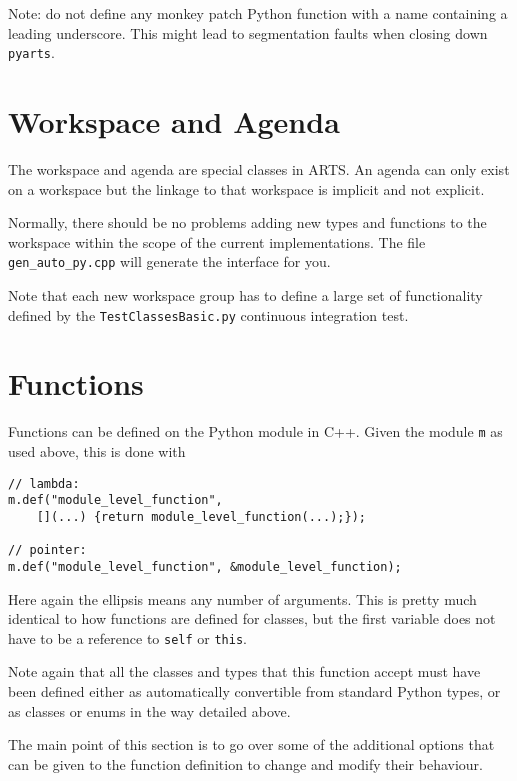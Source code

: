 Note: do not define any monkey patch Python function with a name containing a leading underscore.  This might lead to
segmentation faults when closing down \texttt{pyarts}.

\section{Workspace and Agenda}
The workspace and agenda are special classes in ARTS.  An agenda can only exist on a workspace but the linkage to that workspace 
is implicit and not explicit.

Normally, there should be no problems adding new types and functions to the workspace within the scope of the current implementations.  The file \verb|gen_auto_py.cpp| will generate the interface for you.

Note that each new workspace group has to define a large set of functionality defined by the \verb|TestClassesBasic.py| continuous integration test.

\section{Functions}
Functions can be defined on the Python module in C++.
Given the module \texttt{m} as used above, this is done with
\begin{verbatim}
// lambda:
m.def("module_level_function",
    [](...) {return module_level_function(...);});

// pointer:
m.def("module_level_function", &module_level_function);
\end{verbatim}
Here again the ellipsis means any number of arguments.
This is pretty much identical to how functions are defined for classes, but the first variable does not have to be a reference to \texttt{self} or \texttt{this}.

Note again that all the classes and types that this function accept must have been defined either as automatically convertible from standard Python types, or as classes or enums in the way detailed above.

The main point of this section is to go over some of the additional options that can be given to the function definition to change and modify their behaviour.

